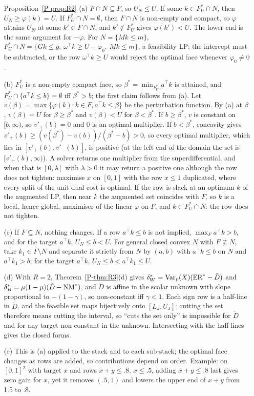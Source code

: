 \begin{proofof}{Proposition~\ref{P-prop:R2}}
(a) $F\cap N\subseteq F$, so $U_N\le U$. If some $k\in F^*_U\cap N$, then
$U_N\ge\varphi(k)=U$. If $F^*_U\cap N=\emptyset$, then $F\cap N$ is non-empty and compact,
so $\varphi$ attains $U_N$ at some $k'\in F\cap N$, and $k'\notin F^*_U$ gives
$\varphi(k')<U$. The lower end is the same argument for $-\varphi$. For $N=\{Mk\le m\}$,
$F^*_U\cap N=\{Gk\le g,\ \omega^\top k\ge U-\varphi_0,\ Mk\le m\}$, a feasibility LP; the
intercept must be subtracted, or the row $\omega^\top k\ge U$ would reject the optimal face
whenever $\varphi_0\ne0$.

(b) $F^*_U$ is a non-empty compact face, so $\beta^*=\min_{F^*_U}a^\top k$ is attained, and
$F^*_U\cap\{a^\top k\le b\}=\emptyset$ iff $\beta^*>b$; the first claim follows from (a).
Let $v(\beta)=\max\{\varphi(k):k\in F,a^\top k\le\beta\}$ be the perturbation function.
By (a) at $\beta$, $v(\beta)=U$ for $\beta\ge\beta^*$ and $v(\beta)<U$ for $\beta<\beta^*$.
If $b\ge\beta^*$, $v$ is constant on $[b,\infty)$, so $v'_+(b)=0$ and $0$ is an optimal
multiplier. If $b<\beta^*$, concavity gives $v'_+(b)\ge(v(\beta^*)-v(b))/(\beta^*-b)>0$,
so every optimal multiplier, which lies in $[v'_+(b),v'_-(b)]$, is positive (at the left
end of the domain the set is $[v'_+(b),\infty)$). A solver returns one multiplier from
the superdifferential, and when that is $[0,\lambda]$ with $\lambda>0$ it may return a
positive one although the row does not tighten: maximise $x$ on $[0,1]$ with the row
$x\le1$ duplicated, where every split of the unit dual cost is optimal. If the row is
slack at an optimum $k$ of the augmented LP, then near $k$ the augmented set coincides
with $F$, so $k$ is a local, hence global, maximiser of the linear $\varphi$ on $F$, and
$k\in F^*_U\cap N$: the row does not tighten.

(c) If $F\subseteq N$, nothing changes. If a row $a^\top k\le b$ is not implied,
$\max_Fa^\top k>b$, and for the target $a^\top k$, $U_N\le b<U$. For general closed convex
$N$ with $F\not\subseteq N$, take $k_1\in F\setminus N$ and separate it strictly from $N$
by $(a,b)$ with $a^\top k\le b$ on $N$ and $a^\top k_1>b$; for the target $a^\top k$,
$U_N\le b<a^\top k_1\le U$.

(d) With $R=2$, Theorem~\ref{P-thm:R3}(d) gives
$\delta^*_W=\operatorname{Var}_p(X)(\mathrm{ER}^*-\tilde D)$ and $\delta^*_B=\mu(1-\mu)(\tilde D-\mathrm{NM}^*)$, and
$\tilde D$ is affine in the scalar unknown with slope proportional to $-(1-\gamma)$, so
non-constant iff $\gamma<1$. Each sign row is a half-line in $\tilde D$, and the feasible
set maps bijectively onto $[L_J,U_J]$; cutting the set therefore means cutting the
interval, so ``cuts the set only'' is impossible for $\tilde D$ and for any target
non-constant in the unknown. Intersecting with the half-lines gives the closed forms.

(e) This is (a) applied to the stack and to each sub-stack; the optimal face changes as
rows are added, so contributions depend on order. Example: on $[0,1]^2$ with target $x$
and rows $x+y\le.8$, $x\le.5$, adding $x+y\le.8$ last gives zero gain for $x$, yet it
removes $(.5,1)$ and lowers the upper end of $x+y$ from 1.5 to .8.
\end{proofof}


